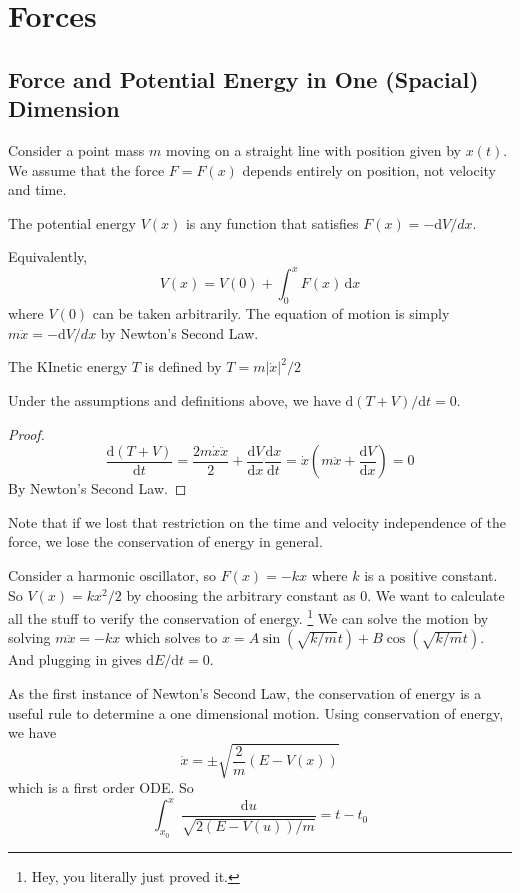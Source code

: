 \section{Forces}
\subsection{Force and Potential Energy in One (Spacial) Dimension}
Consider a point mass $m$ moving on a straight line with position given by $x(t)$.
We assume that the force $F=F(x)$ depends entirely on position, not velocity and time.
\begin{definition}
    The potential energy $V(x)$ is any function that satisfies $F(x)=-\mathrm dV/dx$.
\end{definition}
Equivalently,
$$V(x)=V(0)+\int_0^xF(x)\,\mathrm dx$$
where $V(0)$ can be taken arbitrarily.
The equation of motion is simply $m\ddot{x}=-\mathrm dV/dx$ by Newton's Second Law.
\begin{definition}
    The KInetic energy $T$ is defined by $T=m|\dot{x}|^2/2$
\end{definition}
\begin{theorem}
    Under the assumptions and definitions above, we have $\mathrm d(T+V)/\mathrm dt=0$.
\end{theorem}
\begin{proof}
    $$\frac{\mathrm d(T+V)}{\mathrm dt}=\frac{2m\dot{x}\ddot{x}}{2}+\frac{\mathrm dV}{\mathrm dx}\frac{\mathrm dx}{\mathrm dt}=\dot{x}(m\ddot{x}+\frac{\mathrm dV}{\mathrm dx})=0$$
    By Newton's Second Law.
\end{proof}
Note that if we lost that restriction on the time and velocity independence of the force, we lose the conservation of energy in general.
\begin{example}
    Consider a harmonic oscillator, so $F(x)=-kx$ where $k$ is a positive constant.
    So $V(x)=kx^2/2$ by choosing the arbitrary constant as $0$.
    We want to calculate all the stuff to verify the conservation of energy.
    \footnote{Hey, you literally just proved it.}
    We can solve the motion by solving $m\ddot{x}=-kx$ which solves to $x=A\sin(\sqrt{k/m}t)+B\cos(\sqrt{k/m}t)$.
    And plugging in gives $\mathrm dE/\mathrm dt=0$.
\end{example}
As the first instance of Newton's Second Law, the conservation of energy is a useful rule to determine a one dimensional motion.
Using conservation of energy, we have
$$\dot{x}=\pm\sqrt{\frac{2}{m}(E-V(x))}$$
which is a first order ODE.
So
$$\int_{x_0}^x\frac{\mathrm du}{\sqrt{2(E-V(u))/m}}=t-t_0$$
